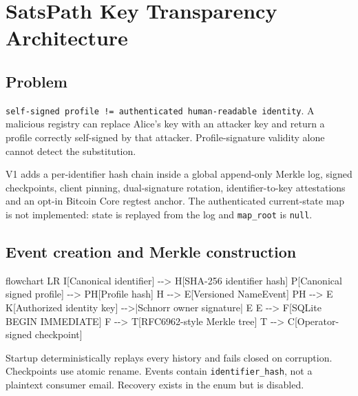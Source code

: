 \documentclass[
]{article}
\author{}
\date{}
\newenvironment{Shaded}{}{}
\newcommand{\NormalTok}[1]{#1}
\begin{document}
\hypertarget{satspath-key-transparency-architecture}{%
\section{SatsPath Key Transparency
Architecture}\label{satspath-key-transparency-architecture}}

\hypertarget{problem}{%
\subsection{Problem}\label{problem}}

\texttt{self-signed\ profile\ !=\ authenticated\ human-readable\ identity}.
A malicious registry can replace Alice's key with an attacker key and
return a profile correctly self-signed by that attacker.
Profile-signature validity alone cannot detect the substitution.

V1 adds a per-identifier hash chain inside a global append-only Merkle
log, signed checkpoints, client pinning, dual-signature rotation,
identifier-to-key attestations and an opt-in Bitcoin Core regtest
anchor. The authenticated current-state map is not implemented: state is
replayed from the log and \texttt{map\_root} is \texttt{null}.

\hypertarget{event-creation-and-merkle-construction}{%
\subsection{Event creation and Merkle
construction}\label{event-creation-and-merkle-construction}}

\begin{Shaded}
\begin{Highlighting}[]
\NormalTok{flowchart LR}
\NormalTok{  I[Canonical identifier] {-}{-}\textgreater{} H[SHA{-}256 identifier hash]}
\NormalTok{  P[Canonical signed profile] {-}{-}\textgreater{} PH[Profile hash]}
\NormalTok{  H {-}{-}\textgreater{} E[Versioned NameEvent]}
\NormalTok{  PH {-}{-}\textgreater{} E}
\NormalTok{  K[Authorized identity key] {-}{-}\textgreater{}|Schnorr owner signature| E}
\NormalTok{  E {-}{-}\textgreater{} F[SQLite BEGIN IMMEDIATE]}
\NormalTok{  F {-}{-}\textgreater{} T[RFC6962{-}style Merkle tree]}
\NormalTok{  T {-}{-}\textgreater{} C[Operator{-}signed checkpoint]}
\end{Highlighting}
\end{Shaded}

Startup deterministically replays every history and fails closed on
corruption. Checkpoints use atomic rename. Events contain
\texttt{identifier\_hash}, not a plaintext consumer email. Recovery
exists in the enum but is disabled.
\end{document}
